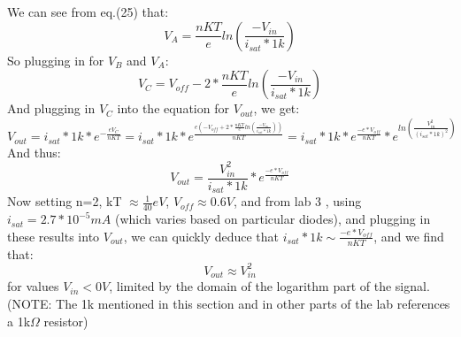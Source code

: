 \documentclass{article}
\begin{document}
    We can see from eq.(25) that:
    \begin{equation}
        V_A = \frac{nKT}{e} ln(\frac{-V_{in}}{i_{sat}*1k})
    \end{equation}
    So plugging in for $V_B$ and $V_A$:
    \begin{equation}
        V_C = V_{off} - 2*\frac{nKT}{e} ln(\frac{-V_{in}}{i_{sat}*1k})
    \end{equation}
    And plugging in $V_C$ into the equation for $V_{out}$, we get:
    \begin{equation}
        V_{out} = i_{sat}*1k*\mathit{e}^{-\frac{eV_{C}}{nKT}} = i_{sat}*1k*\mathit{e}^{\frac{e(-V_{off} + 2*\frac{nKT}{e} ln(\frac{-V_{in}}{i_{sat}*1k}))}{nKT}} = i_{sat}*1k*\mathit{e}^{\frac{-e*V_{off}}{nKT}}*\mathit{e}^{ln(\frac{V_{in}^{2}}{(i_{sat}*1k)^{2}})}
    \end{equation}
    And thus:
    \begin{equation}
        V_{out} = \frac{V_{in}^{2}}{i_{sat}*1k}*\mathit{e}^{\frac{-e*V_{off}}{nKT}}
    \end{equation}
    Now setting n=2, kT $\approx \frac{1}{40}eV$, $V_{off} \approx 0.6V$, and from lab 3 \cite{lab3}, using $i_{sat} = 2.7*10^{-5} mA$ (which varies based on particular diodes), and plugging in these results into $V_{out}$, we can quickly deduce that $i_{sat}*1k \sim \frac{-e*V_{off}}{nKT}$, and we find that:
    \begin{equation}
        V_{out} \approx V_{in}^{2}
    \end{equation}
    for values $V_{in} < 0V$, limited by the domain of the logarithm part of the signal. (NOTE: The 1k mentioned in this section and in other parts of the lab references a 1k$\Omega$ resistor)
    
    
\end{document}
